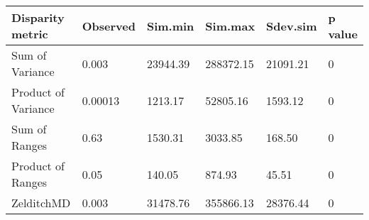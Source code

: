 
\begin{tabular}[t]{l l l l l l }		%
\hline
\textbf{Disparity metric} & \textbf{Observed} & \textbf{Sim.min} & \textbf{Sim.max} & \textbf{Sdev.sim} & \textbf{p value} \\
\hline
Sum of Variance & 0.003 &	23944.39 &	288372.15 &	21091.21 &	0\\
Product of Variance	& 0.00013 &	1213.17 & 52805.16 &	1593.12 &	0\\
Sum of Ranges &	0.63 &	1530.31 &	3033.85 &	168.50 &	0 \\
Product of Ranges & 0.05 &	140.05 & 874.93 &	45.51 &	0\\
ZelditchMD & 0.003 & 31478.76 &	355866.13 &	28376.44 &	0
\\

\hline
\end{tabular}